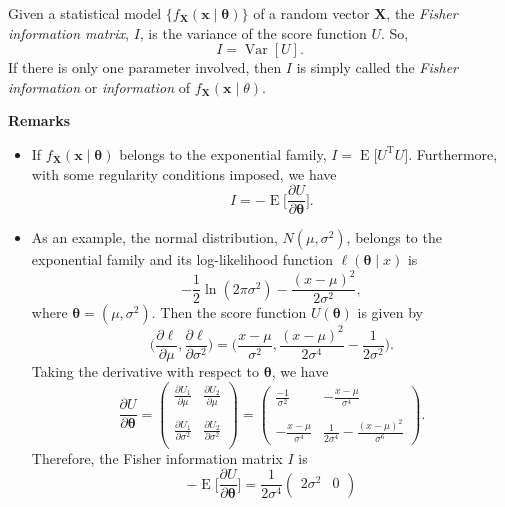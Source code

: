 \documentclass[12pt]{article}
\newcommand{\pdiff}[2]{\frac{\partial #1}{\partial #2}}
\begin{document}

Given a statistical model $\lbrace f_\textbf{X}(\boldsymbol{x}\mid\boldsymbol{\theta})\rbrace$ of a random vector $\textbf{X}$, the \emph{Fisher information matrix}, $I$, is the variance of the score function $U$.  So,
$$I=\operatorname{Var}[U].$$
If there is only one parameter involved, then $I$ is simply called the \emph{Fisher information} or \emph{information} of $f_\textbf{X}(\boldsymbol{x}\mid\theta)$.

\textbf{Remarks}
\begin{itemize}
\item 
If $f_\textbf{X}(\boldsymbol{x}\mid\boldsymbol{\theta})$ belongs to the exponential family, $I=\operatorname{E}\big[U^{\operatorname{T}}U\big]$.  Furthermore, with some regularity conditions imposed, we have $$I=-\operatorname{E}\Big[\frac{\partial U}{\partial\boldsymbol{\theta}}\Big].$$
\item 
As an example, the normal distribution, $N(\mu,\sigma^2)$, belongs to the exponential family and its log-likelihood function $\ell(\boldsymbol{\theta}\mid x)$ is $$-\frac{1}{2}\operatorname{ln}(2\pi\sigma^2)-\frac{(x-\mu)^2}{2\sigma^2},$$ where $\boldsymbol{\theta}=(\mu,\sigma^2)$.  Then the score function $U(\boldsymbol{\theta})$ is given by
$$\Big(\pdiff{\ell}{\mu},\pdiff{\ell}{\sigma^2}\Big) = \Big(\frac{x-\mu}{\sigma^2},\frac{(x-\mu)^2}{2\sigma^4}-\frac{1}{2\sigma^2}\Big).$$
Taking the derivative with respect to $\boldsymbol{\theta}$, we have
$$\frac{\partial U}{\partial\boldsymbol{\theta}}=
\begin{pmatrix}
\displaystyle{\pdiff{U_1}{\mu}} & \displaystyle{\pdiff{U_2}{\mu}} \\ \ \\
\displaystyle{\pdiff{U_1}{\sigma^2}} & \displaystyle{\pdiff{U_2}{\sigma^2}} \\
\end{pmatrix}=
\begin{pmatrix}
\displaystyle{\frac{-1}{\sigma^2}} & \displaystyle{-\frac{x-\mu}{\sigma^4}} \\ \ \\
\displaystyle{-\frac{x-\mu}{\sigma^4}} & \displaystyle{\frac{1}{2\sigma^4}-\frac{(x-\mu)^2}{\sigma^6}}
\end{pmatrix}.$$
Therefore, the Fisher information matrix $I$ is 
$$-\operatorname{E}\Big[\frac{\partial U}{\partial\boldsymbol{\theta}}\Big]=\frac{1}{2\sigma^4}
\begin{pmatrix} 
2\sigma^2 & 0 \\

\end{pmatrix}$$
\end{itemize}
\end{document}
